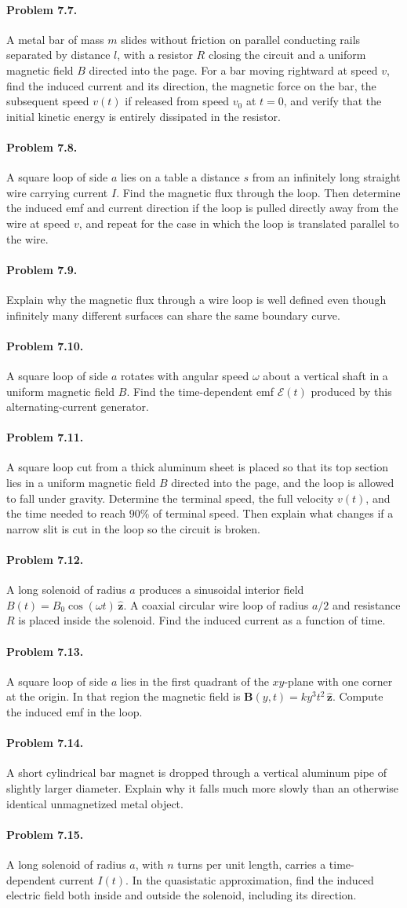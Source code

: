 \documentclass{aa}
\newcommand{\problemstatement}[2]{%
\paragraph{Problem #1.}#2\par\medskip
}
\begin{document}
\problemstatement{7.7}{A metal bar of mass \(m\) slides without friction on parallel conducting rails separated by distance \(l\), with a resistor \(R\) closing the circuit and a uniform magnetic field \(B\) directed into the page. For a bar moving rightward at speed \(v\), find the induced current and its direction, the magnetic force on the bar, the subsequent speed \(v(t)\) if released from speed \(v_0\) at \(t=0\), and verify that the initial kinetic energy is entirely dissipated in the resistor.}
\problemstatement{7.8}{A square loop of side \(a\) lies on a table a distance \(s\) from an infinitely long straight wire carrying current \(I\). Find the magnetic flux through the loop. Then determine the induced emf and current direction if the loop is pulled directly away from the wire at speed \(v\), and repeat for the case in which the loop is translated parallel to the wire.}
\problemstatement{7.9}{Explain why the magnetic flux through a wire loop is well defined even though infinitely many different surfaces can share the same boundary curve.}
\problemstatement{7.10}{A square loop of side \(a\) rotates with angular speed \(\omega\) about a vertical shaft in a uniform magnetic field \(B\). Find the time-dependent emf \(\mathcal{E}(t)\) produced by this alternating-current generator.}
\problemstatement{7.11}{A square loop cut from a thick aluminum sheet is placed so that its top section lies in a uniform magnetic field \(B\) directed into the page, and the loop is allowed to fall under gravity. Determine the terminal speed, the full velocity \(v(t)\), and the time needed to reach \(90\%\) of terminal speed. Then explain what changes if a narrow slit is cut in the loop so the circuit is broken.}
\problemstatement{7.12}{A long solenoid of radius \(a\) produces a sinusoidal interior field \(B(t)=B_0\cos(\omega t)\,\hat{\mathbf z}\). A coaxial circular wire loop of radius \(a/2\) and resistance \(R\) is placed inside the solenoid. Find the induced current as a function of time.}
\problemstatement{7.13}{A square loop of side \(a\) lies in the first quadrant of the \(xy\)-plane with one corner at the origin. In that region the magnetic field is \(\mathbf B(y,t)=ky^3 t^2\,\hat{\mathbf z}\). Compute the induced emf in the loop.}
\problemstatement{7.14}{A short cylindrical bar magnet is dropped through a vertical aluminum pipe of slightly larger diameter. Explain why it falls much more slowly than an otherwise identical unmagnetized metal object.}
\problemstatement{7.15}{A long solenoid of radius \(a\), with \(n\) turns per unit length, carries a time-dependent current \(I(t)\). In the quasistatic approximation, find the induced electric field both inside and outside the solenoid, including its direction.}
\end{document}
